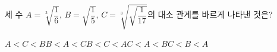 세 수 $A=\sqrt[3]{\dfrac{1}{6}}$, $B=\sqrt{\dfrac{1}{5}}$, $C=\sqrt[3]{\sqrt{\dfrac{1}{17}}}$의 대소 관계를 바르게 나타낸 것은?
\begin{choices32}{$A<C<B$}{$B<A<C$}{$B<C<A$}{$C<A<B$}{$C<B<A$}\end{choices32}
